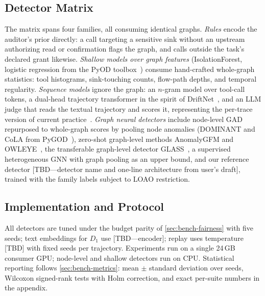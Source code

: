 \subsection{Detector Matrix}
\label{sec:setup-detectors}

The matrix spans four families, all consuming identical graphs. \emph{Rules} encode the auditor's prior directly: a call targeting a sensitive sink without an upstream authorizing read or confirmation flags the graph, and calls outside the task's declared grant likewise. \emph{Shallow models over graph features} (IsolationForest, logistic regression from the PyOD toolbox~\cite{zhao2019pyod}) consume hand-crafted whole-graph statistics: tool histograms, sink-touching counts, flow-path depths, and temporal regularity. \emph{Sequence models} ignore the graph: an $n$-gram model over tool-call tokens, a dual-head trajectory transformer in the spirit of DriftNet~\cite{pinjari2026driftnet}, and an LLM judge that reads the textual trajectory and scores it, representing the per-trace version of current practice~\cite{yuan2024rjudge,li2026unsafer}. \emph{Graph neural detectors} include node-level GAD repurposed to whole-graph scores by pooling node anomalies (DOMINANT and CoLA from PyGOD~\cite{liu2022pygod}), zero-shot graph-level methods AnomalyGFM and OWLEYE~\cite{qiao2025anomalygfm,zheng2026owleye}, the transferable graph-level detector GLASS~\cite{wang2026glass}, a supervised heterogeneous GNN with graph pooling as an upper bound, and our reference detector [TBD---detector name and one-line architecture from user's draft], trained with the family labels subject to LOAO restriction.

\subsection{Implementation and Protocol}
\label{sec:setup-impl}

All detectors are tuned under the budget parity of \cref{sec:bench-fairness} with five seeds; text embeddings for $D_1$ use [TBD---encoder]; replay uses temperature [TBD] with fixed seeds per trajectory. Experiments run on a single 24\,GB consumer GPU; node-level and shallow detectors run on CPU. Statistical reporting follows \cref{sec:bench-metrics}: mean $\pm$ standard deviation over seeds, Wilcoxon signed-rank tests with Holm correction, and exact per-suite numbers in the appendix.
